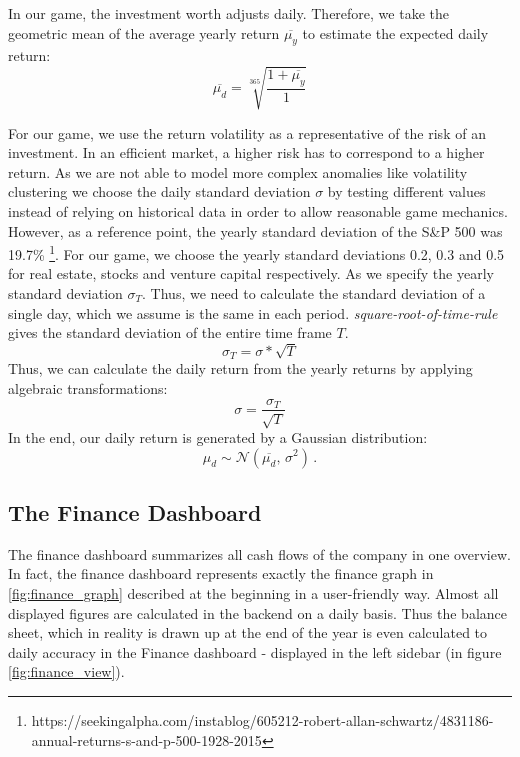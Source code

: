 In our game, the investment worth adjusts daily. Therefore, we take the geometric mean of the average yearly return $\overline{\mu_y}$ to estimate the expected daily return:
\begin{equation}
	\overline{\mu_d} = \sqrt[365]{\frac{1 + \overline{\mu_y}}{1}}
\end{equation}

For our game, we use the return volatility as a representative of the risk of an investment. In an efficient market, a higher risk has to correspond to a higher return. As we are not able to model more complex anomalies like volatility clustering \cite{lux2000volatility} we choose the daily standard deviation $\sigma$ by testing different values instead of relying on historical data in order to allow reasonable game mechanics. However, as a reference point, the yearly standard deviation of the S\&P 500 was 19.7\% \footnote{https://seekingalpha.com/instablog/605212-robert-allan-schwartz/4831186-annual-returns-s-and-p-500-1928-2015}. For our game, we choose the yearly standard deviations 0.2, 0.3 and 0.5 for real estate, stocks and venture capital respectively.
As we specify the yearly standard deviation $\sigma_T$. Thus, we need to calculate the standard deviation of a single day, which we assume is the same in each period. \textit{square-root-of-time-rule} gives the standard deviation of the entire time frame $T$.
\begin{equation}
    \sigma_T = \sigma*\sqrt{T}
\end{equation}
Thus, we can calculate the daily return from the yearly returns by applying algebraic transformations:
\begin{equation}
    \sigma = \frac{\sigma_T}{\sqrt{T}}
\end{equation}
In the end, our daily return is generated by a Gaussian distribution:
\begin{equation}
	\mu_d \sim \mathcal{N}(\overline{\mu_d},\,\sigma^{2})\,.
\end{equation}

\subsection{The Finance Dashboard}
\label{sec:finance_dashboard}

The finance dashboard summarizes all cash flows of the company in one overview. In fact, the finance dashboard represents exactly the finance graph in \ref{fig:finance_graph} described at the beginning in a user-friendly way. Almost all displayed figures are calculated in the backend on a daily basis. Thus the balance sheet, which in reality is drawn up at the end of the year is even calculated to daily accuracy in the Finance dashboard - displayed in the left sidebar (in figure \ref{fig:finance_view}).


